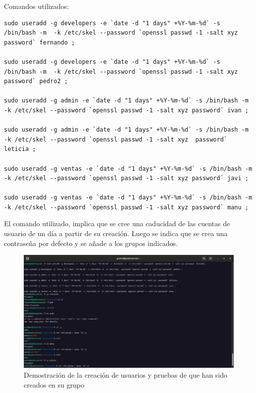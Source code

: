 Comandos utilizados:

\begin{lstlisting}[style=mybash]
sudo useradd -g developers -e `date -d "1 days" +%Y-%m-%d` -s /bin/bash -m  -k /etc/skel --password `openssl passwd -1 -salt xyz password` fernando ;

sudo useradd -g developers -e `date -d "1 days" +%Y-%m-%d` -s /bin/bash -m  -k /etc/skel --password `openssl passwd -1 -salt xyz password` pedro2 ;

sudo useradd -g admin -e `date -d "1 days" +%Y-%m-%d` -s /bin/bash -m  -k /etc/skel --password `openssl passwd -1 -salt xyz password` ivan ;

sudo useradd -g admin -e `date -d "1 days" +%Y-%m-%d` -s /bin/bash -m  -k /etc/skel --password `openssl passwd -1 -salt xyz  password` leticia ; 

sudo useradd -g ventas -e `date -d "1 days" +%Y-%m-%d` -s /bin/bash -m  -k /etc/skel --password `openssl passwd -1 -salt xyz password` javi ;

sudo useradd -g ventas -e `date -d "1 days" +%Y-%m-%d` -s /bin/bash -m  -k /etc/skel --password `openssl passwd -1 -salt xyz password` manu ;
\end{lstlisting}

El comando utilizado, implica que se cree una caducidad de las cuentas de usuario de un día a partir de su creación. Luego se indica que se crea una contraseña por defecto y se añade a los grupos indicados.

\begin{figure}[H]
	\centering
	\includegraphics[scale=0.30]{03}
	\caption{Demostración de la creación de usuarios y pruebas de que han sido creados en su grupo}
\end{figure}

